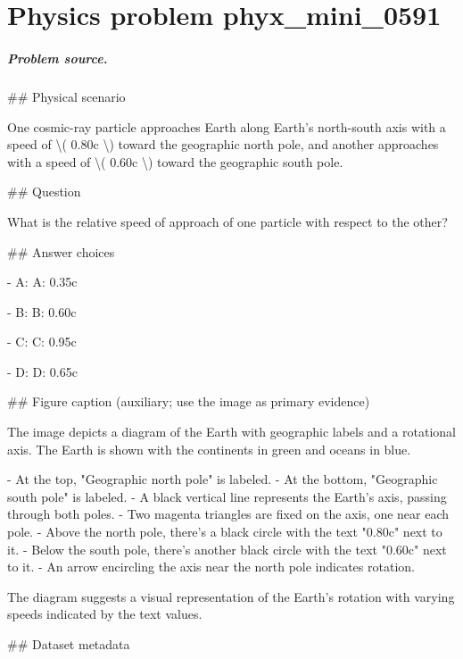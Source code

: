 
\chapter{Physics problem phyx\_mini\_0591}
\label{ch:PhyXMiniProblems_problem_phyx_mini_0591}

\paragraph{Problem source.}
\#\# Physical scenario

One cosmic-ray particle approaches Earth along Earth's north-south axis with a speed of \textbackslash{}( 0.80c \textbackslash{}) toward the geographic north pole, and another approaches with a speed of \textbackslash{}( 0.60c \textbackslash{}) toward the geographic south pole.

\#\# Question

What is the relative speed of approach of one particle with respect to the other?

\#\# Answer choices

- A: A: 0.35c

- B: B: 0.60c

- C: C: 0.95c

- D: D: 0.65c

\#\# Figure caption (auxiliary; use the image as primary evidence)

The image depicts a diagram of the Earth with geographic labels and a rotational axis. The Earth is shown with the continents in green and oceans in blue. 

- At the top, "Geographic north pole" is labeled.
- At the bottom, "Geographic south pole" is labeled.
- A black vertical line represents the Earth's axis, passing through both poles.
- Two magenta triangles are fixed on the axis, one near each pole.
- Above the north pole, there's a black circle with the text "0.80c" next to it.
- Below the south pole, there's another black circle with the text "0.60c" next to it.
- An arrow encircling the axis near the north pole indicates rotation.

The diagram suggests a visual representation of the Earth's rotation with varying speeds indicated by the text values.

\#\# Dataset metadata

